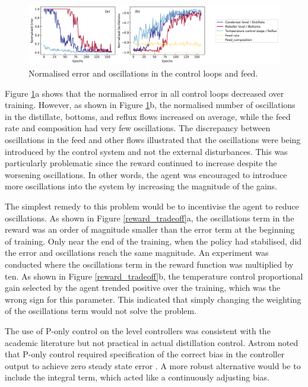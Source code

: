 \begin{figure}[t]
  \includegraphics[width=1.2\textwidth]{gfx/Chapter05/dis3_74_errors_oscillations}
  \caption{Normalised error and oscillations in the control loops and feed.}
  \label{errors_oscillations}
\end{figure}

Figure \ref{errors_oscillations}a shows that the normalised error in all control loops decreased over training. However, as shown in Figure \ref{errors_oscillations}b, the normalised number of oscillations in the distillate, bottoms, and reflux flows increased on average, while the feed rate and composition had very few oscillations. The discrepancy between oscillations in the feed and other flows illustrated that the oscillations were being introduced by the control system and not the external disturbances. This was particularly problematic since the reward continued to increase despite the worsening oscillations. In other words, the agent was encouraged to introduce more oscillations into the system by increasing the magnitude of the gains.

The simplest remedy to this problem would be to incentivise the agent to reduce oscillations. As shown in Figure \ref{reward_tradeoff}a, the oscillations term in the reward was an order of magnitude smaller than the error term at the beginning of training. Only near the end of the training, when the policy had stabilised, did the error and oscillations reach the same magnitude. An experiment was conducted where the oscillations term in the reward function was multiplied by ten. As shown in Figure \ref{reward_tradeoff}b, the temperature control proportional gain selected by the agent trended positive over the training, which was the wrong sign for this parameter. This indicated that simply changing the weighting of the oscillations term would not solve the problem.

The use of P-only control on the level controllers was consistent with the academic literature\cite{Skogestad1988} but not practical in actual distillation control. Astrom noted that P-only control required specification of the correct bias in the controller output to achieve zero steady state error \cite{Astrom2006}. A more robust alternative would be to include the integral term, which acted like a continuously adjusting bias.


